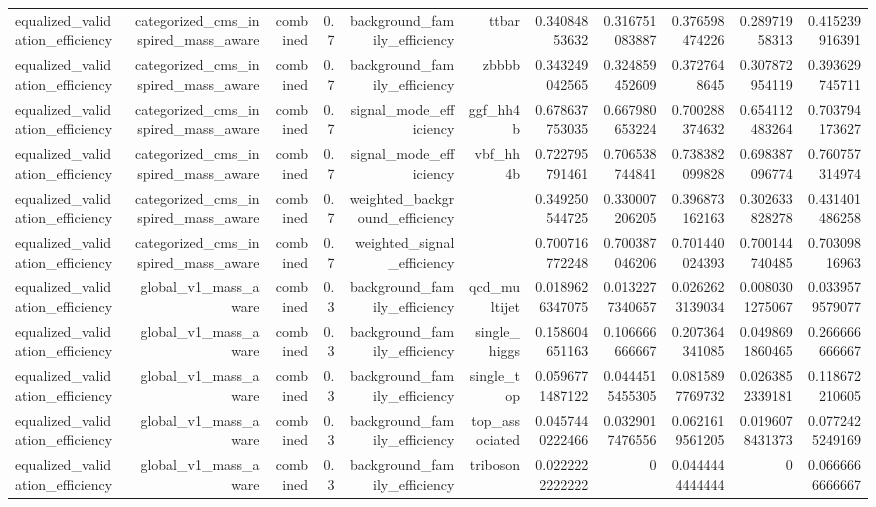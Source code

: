 \begin{table}[htbp]
{\begin{tabular}{lrrrrrrrrrr}
equalized\_validation\_efficiency & categorized\_cms\_inspired\_mass\_aware & combined & 0.7 & background\_family\_efficiency & ttbar & 0.34084853632 & 0.316751083887 & 0.376598474226 & 0.28971958313 & 0.415239916391 \\
equalized\_validation\_efficiency & categorized\_cms\_inspired\_mass\_aware & combined & 0.7 & background\_family\_efficiency & zbbbb & 0.343249042565 & 0.324859452609 & 0.3727648645 & 0.307872954119 & 0.393629745711 \\
equalized\_validation\_efficiency & categorized\_cms\_inspired\_mass\_aware & combined & 0.7 & signal\_mode\_efficiency & ggf\_hh4b & 0.678637753035 & 0.667980653224 & 0.700288374632 & 0.654112483264 & 0.703794173627 \\
equalized\_validation\_efficiency & categorized\_cms\_inspired\_mass\_aware & combined & 0.7 & signal\_mode\_efficiency & vbf\_hh4b & 0.722795791461 & 0.706538744841 & 0.738382099828 & 0.698387096774 & 0.760757314974 \\
equalized\_validation\_efficiency & categorized\_cms\_inspired\_mass\_aware & combined & 0.7 & weighted\_background\_efficiency &  & 0.349250544725 & 0.330007206205 & 0.396873162163 & 0.302633828278 & 0.431401486258 \\
equalized\_validation\_efficiency & categorized\_cms\_inspired\_mass\_aware & combined & 0.7 & weighted\_signal\_efficiency &  & 0.700716772248 & 0.700387046206 & 0.701440024393 & 0.700144740485 & 0.70309816963 \\
equalized\_validation\_efficiency & global\_v1\_mass\_aware & combined & 0.3 & background\_family\_efficiency & qcd\_multijet & 0.0189626347075 & 0.0132277340657 & 0.0262623139034 & 0.0080301275067 & 0.0339579579077 \\
equalized\_validation\_efficiency & global\_v1\_mass\_aware & combined & 0.3 & background\_family\_efficiency & single\_higgs & 0.158604651163 & 0.106666666667 & 0.207364341085 & 0.0498691860465 & 0.266666666667 \\
equalized\_validation\_efficiency & global\_v1\_mass\_aware & combined & 0.3 & background\_family\_efficiency & single\_top & 0.0596771487122 & 0.0444515455305 & 0.0815897769732 & 0.0263852339181 & 0.118672210605 \\
equalized\_validation\_efficiency & global\_v1\_mass\_aware & combined & 0.3 & background\_family\_efficiency & top\_associated & 0.0457440222466 & 0.0329017476556 & 0.0621619561205 & 0.0196078431373 & 0.0772425249169 \\
equalized\_validation\_efficiency & global\_v1\_mass\_aware & combined & 0.3 & background\_family\_efficiency & triboson & 0.0222222222222 & 0 & 0.0444444444444 & 0 & 0.0666666666667 \\

\end{tabular}}
\end{table}
